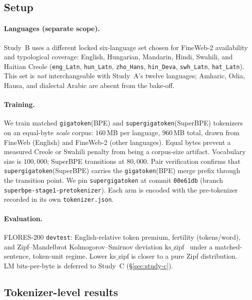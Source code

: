 \documentclass[11pt,a4paper]{article}
\begin{document}
\subsection{Setup}

\paragraph{Languages (separate scope).}
Study~B uses a different locked six-language set chosen for FineWeb-2 availability and typological coverage:
English, Hungarian, Mandarin, Hindi, Swahili, and Haitian Creole
(\texttt{eng\_Latn}, \texttt{hun\_Latn}, \texttt{zho\_Hans}, \texttt{hin\_Deva}, \texttt{swh\_Latn}, \texttt{hat\_Latn}).
This set is \emph{not} interchangeable with Study~A's twelve languages; Amharic, Odia, Hausa, and dialectal Arabic are absent from the bake-off.

\paragraph{Training.}
We train matched \texttt{gigatoken}(BPE) and \texttt{supergigatoken}(SuperBPE) tokenizers~\citep{roed2026gigatoken,verma2026supergigatoken} on an equal-byte \emph{scale} corpus: $160$\,MB per language, $960$\,MB total, drawn from FineWeb (English) and FineWeb-2 (other languages).
Equal bytes prevent a measured Creole or Swahili penalty from being a corpus-size artifact.
Vocabulary size is $100{,}000$; SuperBPE transitions at $80{,}000$.
Pair verification confirms that \texttt{supergigatoken}(SuperBPE) carries the \texttt{gigatoken}(BPE) merge prefix through the transition point.
We pin \texttt{supergigatoken} at commit \texttt{00e61db} (branch \texttt{superbpe-stage1-pretokenizer}).
Each arm is encoded with the pre-tokenizer recorded in its own \texttt{tokenizer.json}.

\paragraph{Evaluation.}
FLORES-200 \texttt{devtest}: English-relative token premium, fertility (tokens/word), and Zipf--Mandelbrot Kolmogorov--Smirnov deviation $\mathrm{ks\_zipf}$~\citep{clauset2009power} under a matched-sentence, token-unit regime.
Lower $\mathrm{ks\_zipf}$ is closer to a pure Zipf distribution.
LM bits-per-byte is deferred to Study~C (\S\ref{sec:study-c}).

\subsection{Tokenizer-level results}
\end{document}
